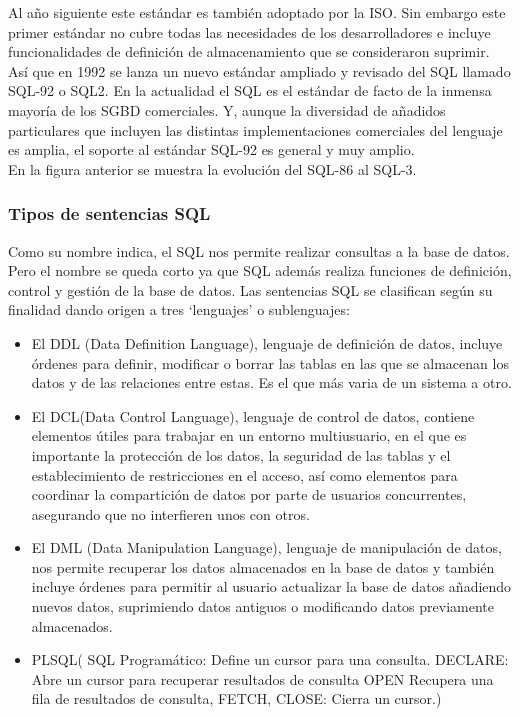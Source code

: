 \documentclass[preprint,12pt]{elsarticle}
\begin{document}
Al año siguiente este estándar es también adoptado por la ISO. Sin embargo este primer estándar no cubre todas las necesidades de los desarrolladores e incluye funcionalidades de definición de almacenamiento que se consideraron suprimir. Así que en 1992 se lanza un nuevo estándar ampliado y revisado del SQL llamado SQL-92 o SQL2. En la actualidad el SQL es el estándar de facto de la inmensa mayoría de los SGBD comerciales. Y, aunque la diversidad de añadidos particulares que incluyen las distintas implementaciones comerciales del lenguaje es amplia, el soporte al estándar SQL-92 es general y muy amplio. \cite{SQLne}
\\ En la figura anterior se muestra la evolución del SQL-86 al SQL-3. \cite{Miguel1999}

\subsubsection{\textbf{Tipos de sentencias SQL}}
Como su nombre indica, el SQL nos permite realizar consultas a la base de datos. Pero el nombre se queda corto ya que SQL además realiza funciones de definición, control y gestión de la base de datos. Las sentencias SQL se clasifican según su finalidad dando origen a tres ‘lenguajes’ o sublenguajes:
\begin{itemize}
\item El DDL (Data Definition Language), lenguaje de definición de datos, incluye órdenes para definir, modificar o borrar las tablas en las que se almacenan los datos y de las relaciones entre estas. Es el que más varia de un sistema a otro.

\item El DCL(Data Control Language), lenguaje de control de datos, contiene elementos útiles para trabajar en un entorno multiusuario, en el que es importante la protección de los datos, la seguridad de las tablas y el establecimiento de restricciones en el acceso, así como elementos para coordinar la compartición de datos por parte de usuarios concurrentes, asegurando que no interfieren unos con otros.

\item El DML (Data Manipulation Language), lenguaje de manipulación de datos, nos permite recuperar los datos almacenados en la base de datos y también incluye órdenes para permitir al usuario actualizar la base de datos añadiendo nuevos datos, suprimiendo datos antiguos o modificando datos previamente almacenados.

\item PLSQL( SQL Programático: Define un cursor para una consulta. DECLARE: Abre un cursor para recuperar resultados de consulta OPEN Recupera una fila de resultados de consulta, FETCH, CLOSE: Cierra un cursor.)\cite{SQLne}
\end{itemize}
\end{document}
